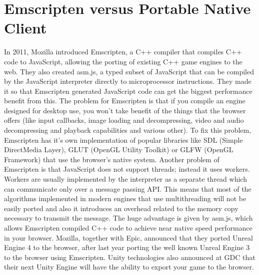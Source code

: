 \section{Emscripten versus Portable Native Client}
\label{sec: Emscripten, PNaCl}

In 2011, Mozilla introduced Emscripten, a C++ compiler that compiles C++ code to JavaScript, allowing the porting of existing C++ game engines to the web. They also created asm.js, a typed subset of JavaScript that can be compiled by the JavaScript interpreter directly to microprocessor instructions. They made it so that Emscripten generated JavaScript code can get the biggest performance benefit from this. The problem for Emscripten is that if you compile an engine designed for desktop use, you won't take benefit of the things that the browser offers (like input callbacks, image loading and decompressing, video and audio decompressing and playback capabilities and various other). To fix this problem, Emscripten has it's own implementation of popular libraries like SDL (Simple DirectMedia Layer), GLUT (OpenGL Utility Toolkit) or GLFW (OpenGL Framework) that use the browser's native system. Another problem of Emscripten is that JavaScript does not support threads; instead it uses workers. Workers are usually implemented by the interpreter as a separate thread which can communicate only over a message passing API. This means that most of the algorithms implemented in modern engines that use multithreading will not be easily ported and also it introduces an overhead related to the memory copy necessary to transmit the message. The huge advantage is given by asm.js, which allows Emscripten compiled C++ code to achieve near native speed performance in your browser. Mozilla, together with Epic, announced that they ported Unreal Engine 4 to the browser, after last year porting the well known Unreal Engine 3 to the browser using Emscripten. Unity technologies also announced at GDC that their next Unity Engine will have the ability to export your game to the browser.


